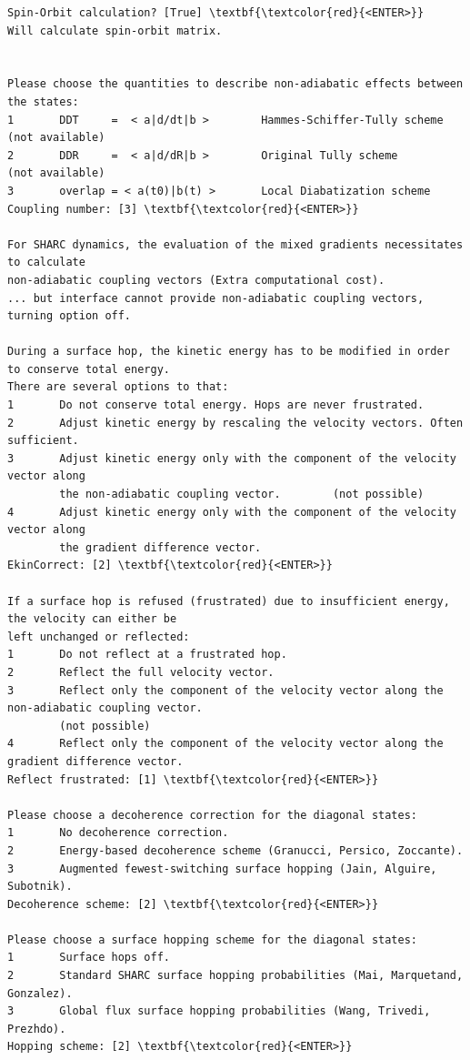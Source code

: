 \documentclass[a4paper,11pt,DIV=15,openany]{scrbook}
\begin{document}
\begin{oframed}
\begin{Verbatim}[commandchars=\\\{\}]
Spin-Orbit calculation? [True] \textbf{\textcolor{red}{<ENTER>}}
Will calculate spin-orbit matrix.


Please choose the quantities to describe non-adiabatic effects between the states:
1       DDT     =  < a|d/dt|b >        Hammes-Schiffer-Tully scheme   (not available)
2       DDR     =  < a|d/dR|b >        Original Tully scheme          (not available)
3       overlap = < a(t0)|b(t) >       Local Diabatization scheme     
Coupling number: [3] \textbf{\textcolor{red}{<ENTER>}}

For SHARC dynamics, the evaluation of the mixed gradients necessitates to calculate 
non-adiabatic coupling vectors (Extra computational cost).
... but interface cannot provide non-adiabatic coupling vectors, turning option off.

During a surface hop, the kinetic energy has to be modified in order to conserve total energy. 
There are several options to that:
1       Do not conserve total energy. Hops are never frustrated.
2       Adjust kinetic energy by rescaling the velocity vectors. Often sufficient.
3       Adjust kinetic energy only with the component of the velocity vector along 
        the non-adiabatic coupling vector.        (not possible)
4       Adjust kinetic energy only with the component of the velocity vector along
        the gradient difference vector.
EkinCorrect: [2] \textbf{\textcolor{red}{<ENTER>}}

If a surface hop is refused (frustrated) due to insufficient energy, the velocity can either be 
left unchanged or reflected:
1       Do not reflect at a frustrated hop.
2       Reflect the full velocity vector.
3       Reflect only the component of the velocity vector along the non-adiabatic coupling vector.
        (not possible)
4       Reflect only the component of the velocity vector along the gradient difference vector.
Reflect frustrated: [1] \textbf{\textcolor{red}{<ENTER>}}

Please choose a decoherence correction for the diagonal states:
1       No decoherence correction.
2       Energy-based decoherence scheme (Granucci, Persico, Zoccante).
3       Augmented fewest-switching surface hopping (Jain, Alguire, Subotnik).
Decoherence scheme: [2] \textbf{\textcolor{red}{<ENTER>}}

Please choose a surface hopping scheme for the diagonal states:
1       Surface hops off.
2       Standard SHARC surface hopping probabilities (Mai, Marquetand, Gonzalez).
3       Global flux surface hopping probabilities (Wang, Trivedi, Prezhdo).
Hopping scheme: [2] \textbf{\textcolor{red}{<ENTER>}}


\end{Verbatim}
\end{oframed}
\end{document}
